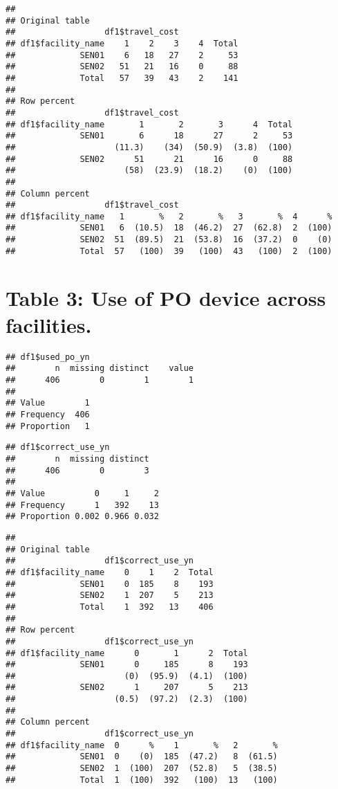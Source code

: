 \documentclass[
]{article}
\begin{document}
\begin{verbatim}
## 
## Original table 
##                  df1$travel_cost
## df1$facility_name    1    2    3    4  Total
##             SEN01    6   18   27    2     53
##             SEN02   51   21   16    0     88
##             Total   57   39   43    2    141
## 
## Row percent 
##                  df1$travel_cost
## df1$facility_name       1       2       3      4  Total
##             SEN01       6      18      27      2     53
##                    (11.3)    (34)  (50.9)  (3.8)  (100)
##             SEN02      51      21      16      0     88
##                      (58)  (23.9)  (18.2)    (0)  (100)
## 
## Column percent 
##                  df1$travel_cost
## df1$facility_name   1       %   2       %   3       %  4      %
##             SEN01   6  (10.5)  18  (46.2)  27  (62.8)  2  (100)
##             SEN02  51  (89.5)  21  (53.8)  16  (37.2)  0    (0)
##             Total  57   (100)  39   (100)  43   (100)  2  (100)
\end{verbatim}

\hypertarget{table-3-use-of-po-device-across-facilities.}{%
\section{Table 3: Use of PO device across
facilities.}\label{table-3-use-of-po-device-across-facilities.}}

\begin{verbatim}
## df1$used_po_yn 
##        n  missing distinct    value 
##      406        0        1        1 
##               
## Value        1
## Frequency  406
## Proportion   1
\end{verbatim}

\begin{verbatim}
## df1$correct_use_yn 
##        n  missing distinct 
##      406        0        3 
##                             
## Value          0     1     2
## Frequency      1   392    13
## Proportion 0.002 0.966 0.032
\end{verbatim}

\begin{verbatim}
## 
## Original table 
##                  df1$correct_use_yn
## df1$facility_name    0    1    2  Total
##             SEN01    0  185    8    193
##             SEN02    1  207    5    213
##             Total    1  392   13    406
## 
## Row percent 
##                  df1$correct_use_yn
## df1$facility_name      0       1      2  Total
##             SEN01      0     185      8    193
##                      (0)  (95.9)  (4.1)  (100)
##             SEN02      1     207      5    213
##                    (0.5)  (97.2)  (2.3)  (100)
## 
## Column percent 
##                  df1$correct_use_yn
## df1$facility_name  0      %    1       %   2       %
##             SEN01  0    (0)  185  (47.2)   8  (61.5)
##             SEN02  1  (100)  207  (52.8)   5  (38.5)
##             Total  1  (100)  392   (100)  13   (100)
\end{verbatim}
\end{document}
